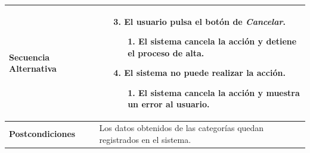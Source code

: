\begin{longtable}{| p{4cm} | p{10cm} |}
\\
\hline
\textbf{Secuencia Alternativa} &\mbox{}\par\vspace{-\baselineskip}
\begin{enumerate}[leftmargin=0.9cm, topsep=0.1cm]
\item[3.] El usuario pulsa el botón de \textit{Cancelar}.
	\begin{itemize}
	\item[1.] El sistema cancela la acción y detiene el proceso de alta.
	\end{itemize}
\item[4.] El sistema no puede realizar la acción.
	\begin{itemize}
	\item[1.] El sistema cancela la acción y muestra un error al usuario.
	\end{itemize}
\end{enumerate}
\\

\hline
\textbf{Postcondiciones} & 
Los datos obtenidos de las categorías quedan registrados en el sistema.\\
\hline
\end{longtable}



\newpage
